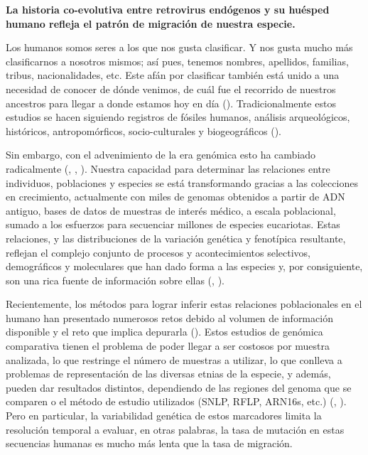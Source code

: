 \documentclass[
  12pt, krantz2,
  spanish,
]{krantz}
\begin{document}
\textbf{La historia co-evolutiva entre retrovirus endógenos y su huésped humano refleja el patrón de migración de nuestra especie.}

Los humanos somos seres a los que nos gusta clasificar. Y nos gusta mucho más clasificarnos a nosotros mismos; así pues, tenemos nombres, apellidos, familias, tribus, nacionalidades, etc. Este afán por clasificar también está unido a una necesidad de conocer de dónde venimos, de cuál fue el recorrido de nuestros ancestros para llegar a donde estamos hoy en día (\citet{terrell1977biology}). Tradicionalmente estos estudios se hacen siguiendo registros de fósiles humanos, análisis arqueológicos, históricos, antropomórficos, socio-culturales y biogeográficos (\citet{terrell1977biology}).

Sin embargo, con el advenimiento de la era genómica esto ha cambiado radicalmente (\citet{kolb2013using}, \citet{wohns2022unified}, \citet{kajan2020virus}). Nuestra capacidad para determinar las relaciones entre individuos, poblaciones y especies se está transformando gracias a las colecciones en crecimiento, actualmente con miles de genomas obtenidos a partir de ADN antiguo, bases de datos de muestras de interés médico, a escala poblacional, sumado a los esfuerzos para secuenciar millones de especies eucariotas. Estas relaciones, y las distribuciones de la variación genética y fenotípica resultante, reflejan el complejo conjunto de procesos y acontecimientos selectivos, demográficos y moleculares que han dado forma a las especies y, por consiguiente, son una rica fuente de información sobre ellas (\citet{kolb2013using}, \citet{wohns2022unified}).

Recientemente, los métodos para lograr inferir estas relaciones poblacionales en el humano han presentado numerosos retos debido al volumen de información disponible y el reto que implica depurarla (\citet{wohns2022unified}). Estos estudios de genómica comparativa tienen el problema de poder llegar a ser costosos por muestra analizada, lo que restringe el número de muestras a utilizar, lo que conlleva a problemas de representación de las diversas etnias de la especie, y además, pueden dar resultados distintos, dependiendo de las regiones del genoma que se comparen o el método de estudio utilizados (SNLP, RFLP, ARN16s, etc.) (\citet{kolb2013using}, \citet{wohns2022unified}). Pero en particular, la variabilidad genética de estos marcadores limita la resolución temporal a evaluar, en otras palabras, la tasa de mutación en estas secuencias humanas es mucho más lenta que la tasa de migración.
\end{document}

